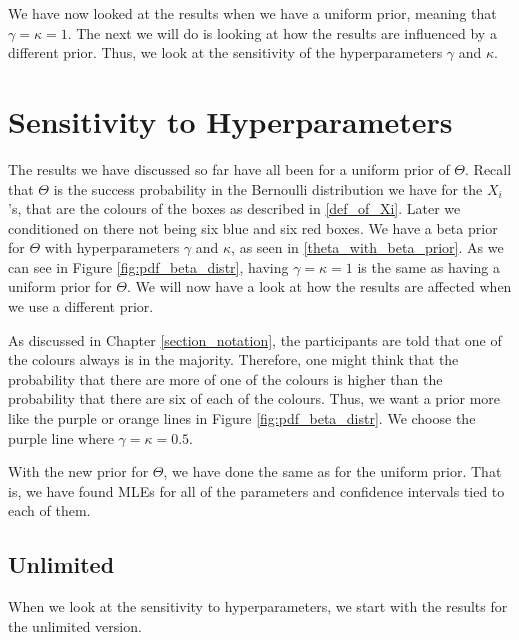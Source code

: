 We have now looked at the results when we have a uniform prior, meaning that $\gamma=\kappa =1$. The next we will do is looking at how the results are influenced by a different prior. Thus, we look at the sensitivity of the hyperparameters $\gamma$ and $\kappa$.





\section{Sensitivity to Hyperparameters}
The results we have discussed so far have all been for a uniform prior of $\Theta$. 
Recall that $\Theta$ is the success probability in the Bernoulli distribution we have for the $X_i$'s, that are the colours of the boxes as described in \eqref{def_of_Xi}. Later we conditioned on there not being six blue and six red boxes. We have a beta prior for $\Theta$ with hyperparameters $\gamma$ and $\kappa$, as seen in \eqref{theta_with_beta_prior}. As we can see in Figure \ref{fig:pdf_beta_distr}, having $\gamma=\kappa=1$ is the same as having a uniform prior for $\Theta$. We will now have a look at how the results are affected when we use a different prior. 

As discussed in Chapter \ref{section_notation}, the participants are told that one of the colours always is in the majority. Therefore, one might think that the probability that there are more of one of the colours is higher than the probability that there are six of each of the colours. Thus, we want a prior more like the purple or orange lines in Figure \ref{fig:pdf_beta_distr}. We choose the purple line where $\gamma=\kappa=0.5$.

With the new prior for $\Theta$, we have done the same as for the uniform prior. That is, we have found MLEs for all of the parameters and confidence intervals tied to each of them.



\subsection{Unlimited}
When we look at the sensitivity to hyperparameters, we start with the results for the unlimited version.

